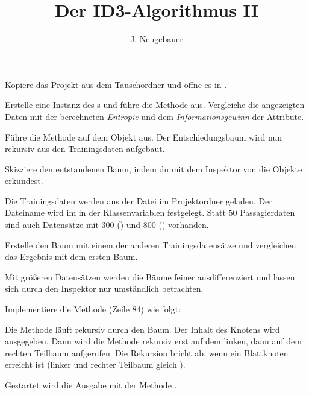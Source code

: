 \documentclass[10pt, a4paper]{scrartcl}
\author{J. Neugebauer}
\title{Der ID3-Algorithmus II}
\date{\Heute}
\begin{document}
\ReiheTitel

Kopiere das Projekt  aus dem Tauschordner
und öffne es in .

\begin{aufgabe}
	Erstelle eine Instanz des s und führe die Methode  aus. Vergleiche die angezeigten Daten mit der berechneten \emph{Entropie} und dem \emph{Informationsgewinn} der Attribute.
\end{aufgabe}

\begin{aufgabe}
	Führe die Methode  auf dem Objekt aus. Der
	Entschiedungsbaum wird nun rekursiv aus den Trainingsdaten aufgebaut.
	
	Skizziere den entstandenen Baum, indem du mit dem Inspektor von 
	 die Objekte erkundest.
	
	\begin{rahmen}
		\vspace*{4cm}
	\end{rahmen}
	\medskip
\end{aufgabe}

\begin{aufgabe}
	Die Trainingsdaten werden aus der Datei  im Projektordner geladen. Der Dateiname wird im  in der Klassenvariablen  festgelegt. Statt 50 Passagierdaten sind auch Datensätze mit 300 () und 800 () vorhanden.
	
	Erstelle den Baum mit einem der anderen Trainingsdatensätze und vergleichen
	das Ergebnis mit dem ersten Baum.
	
\end{aufgabe}

\begin{aufgabe}
	Mit größeren Datensätzen werden die Bäume feiner ausdifferenziert und lassen sich durch den Inspektor nur umständlich betrachten.
	
	Implementiere die Methode  (Zeile 84) wie folgt:
	
	Die Methode läuft rekursiv durch den Baum. Der Inhalt des Knotens wird ausgegeben. Dann wird die Methode rekursiv erst auf dem linken, dann auf dem rechten Teilbaum aufgerufen. Die Rekursion bricht ab, wenn ein Blattknoten erreicht ist (linker und rechter Teilbaum gleich ).
	
	Gestartet wird die Ausgabe mit der Methode .
\end{aufgabe}
\end{document}
